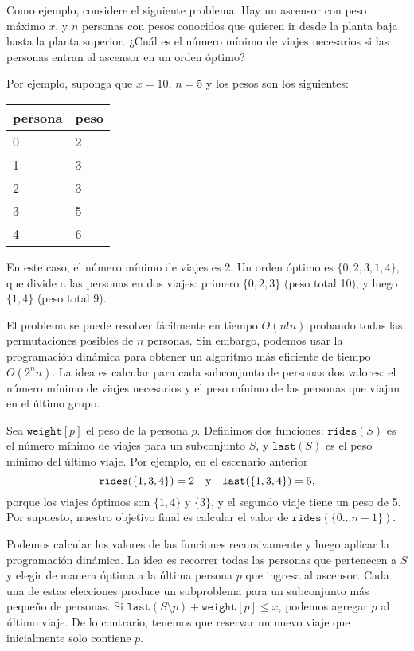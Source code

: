 Como ejemplo, considere el siguiente problema:
Hay un ascensor con peso máximo $x$,
y $n$ personas con pesos conocidos
que quieren ir desde la planta baja
hasta la planta superior.
¿Cuál es el número mínimo de viajes necesarios
si las personas entran al ascensor en un orden óptimo?

Por ejemplo, suponga que $x=10$, $n=5$
y los pesos son los siguientes:
\begin{center}
\begin{tabular}{ll}
persona & peso \\
\hline
0 & 2 \\
1 & 3 \\
2 & 3 \\
3 & 5 \\
4 & 6 \\
\end{tabular}
\end{center}
En este caso, el número mínimo de viajes es 2.
Un orden óptimo es $\{0,2,3,1,4\}$,
que divide a las personas en dos viajes:
primero $\{0,2,3\}$ (peso total 10),
y luego $\{1,4\}$ (peso total 9).

El problema se puede resolver fácilmente en tiempo $O(n! n)$
probando todas las permutaciones posibles de $n$ personas.
Sin embargo, podemos usar la programación dinámica para obtener
un algoritmo más eficiente de tiempo $O(2^n n)$.
La idea es calcular para cada subconjunto de personas
dos valores: el número mínimo de viajes necesarios y
el peso mínimo de las personas que viajan en el último grupo.

Sea $\texttt{weight}[p]$ el peso de
la persona $p$.
Definimos dos funciones:
$\texttt{rides}(S)$ es el número mínimo de
viajes para un subconjunto $S$,
y $\texttt{last}(S)$ es el peso mínimo
del último viaje.
Por ejemplo, en el escenario anterior
\[ \texttt{rides}(\{1,3,4\})=2 \hspace{10px} \textrm{y}
\hspace{10px} \texttt{last}(\{1,3,4\})=5,\]
porque los viajes óptimos son $\{1,4\}$ y $\{3\}$,
y el segundo viaje tiene un peso de 5.
Por supuesto, nuestro objetivo final es calcular el valor
de $\texttt{rides}(\{0 \ldots n-1\})$.

Podemos calcular los valores
de las funciones recursivamente y luego aplicar
la programación dinámica.
La idea es recorrer todas las personas
que pertenecen a $S$ y elegir de manera óptima
a la última persona $p$ que ingresa al ascensor.
Cada una de estas elecciones produce un subproblema
para un subconjunto más pequeño de personas.
Si $\texttt{last}(S \setminus p)+\texttt{weight}[p] \le x$,
podemos agregar $p$ al último viaje.
De lo contrario, tenemos que reservar un nuevo viaje
que inicialmente solo contiene $p$.

